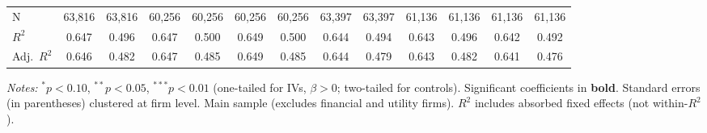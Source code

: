 \begin{landscape}
\begin{table}[H]
\begin{tabular}{lcccccccccccc}
\midrule
N & 63,816 & 63,816 & 60,256 & 60,256 & 60,256 & 60,256 & 63,397 & 63,397 & 61,136 & 61,136 & 61,136 & 61,136 \\
$R^2$ & 0.647 & 0.496 & 0.647 & 0.500 & 0.649 & 0.500 & 0.644 & 0.494 & 0.643 & 0.496 & 0.642 & 0.492 \\
Adj.~$R^2$ & 0.646 & 0.482 & 0.647 & 0.485 & 0.649 & 0.485 & 0.644 & 0.479 & 0.643 & 0.482 & 0.641 & 0.476 \\
\bottomrule
\end{tabular}
\begin{minipage}{\linewidth}
\vspace{2pt}\scriptsize
\textit{Notes:} $^{*}p<0.10$, $^{**}p<0.05$, $^{***}p<0.01$ (one-tailed for IVs, $\beta > 0$; two-tailed for controls).
 Significant coefficients in \textbf{bold}.
 Standard errors (in parentheses) clustered at firm level.
 Main sample (excludes financial and utility firms).
 $R^2$ includes absorbed fixed effects (not within-$R^2$).
\end{minipage}
\end{table}
\end{landscape}